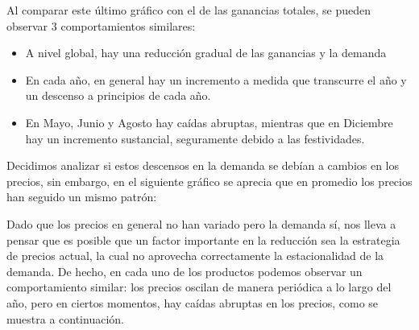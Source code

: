 \documentclass[12pt,a4paper]{article}
\begin{document}
Al comparar este último gráfico con el de las ganancias totales, se pueden observar 3 comportamientos similares: 
\begin{itemize}
    \item A nivel global, hay una reducción gradual de las ganancias y la demanda 
    \item En cada año, en general hay un incremento a medida que transcurre el año y un descenso a principios de cada año.
    \item En Mayo, Junio y Agosto hay caídas abruptas, mientras que en Diciembre hay un incremento sustancial, seguramente debido a las festividades.
\end{itemize}

Decidimos analizar si estos descensos en la demanda se debían a cambios en los precios, sin embargo, en el siguiente gráfico se aprecia 
que en promedio los precios han seguido un mismo patrón:

\begin{center}
\end{center}

Dado que los precios en general no han variado pero la demanda sí, nos lleva a pensar que es posible que un factor 
importante en la reducción sea la estrategia de precios actual, la cual no aprovecha correctamente 
la estacionalidad de la demanda. De hecho, en cada uno de los productos podemos 
observar un comportamiento similar: los precios oscilan de manera periódica a lo largo del año, pero en ciertos 
momentos, hay caídas abruptas en los precios, como se muestra a continuación.

\begin{center}
\end{center}
\end{document}
